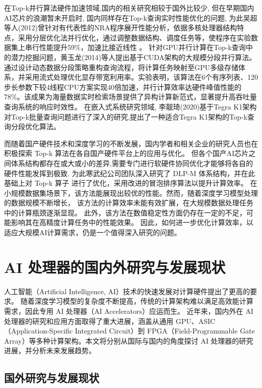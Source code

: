 在Top-k并行算法硬件加速领域,国内的相关研究相较于国外比较少,
但在早期国内AI芯片的浪潮暂未开启时, 国内同样存在Top-k查询实时性能优化的问题,
为此吴超等人(2012)曾针对有代表性的NRA程序展开性能分析，依据多核处理器结构特点，采用分层优化法并行优化，通过调整数据结构、调度任务等，使程序在实验数据集上串行性能提升59\%，加速比接近线性 \cite{XXWX201207019}。 
针对GPU并行计算在Top-k查询中的潜力挖掘问题，黄玉龙(2014)等人提出基于CUDA架构的大规模分段并行算法。通过设计动态数据分段策略重构查询流程，将计算任务映射至GPU多级存储体系，并采用流式处理优化显存带宽利用率。实验表明，该算法在6个有序列表、120步长参数下较4线程CPU方案实现40倍加速，并行计算效率达硬件峰值性能的78\%。该成果为海量数据实时检索场景提供了异构计算新范式，显著提升高吞吐量查询系统的响应时效性。
在嵌入式系统研究领域, 李靓琦(2020)基于Tegra K1架构对Top-k批量查询问题进行了深入的研究,提出了一种适合Tegra K1架构的Top-k查询分段优化算法\cite{DZRU202017051}。

而随着国产硬件技术和深度学习的不断发展，国内学者和相关企业的研究人员也在积极探索 Top-k 算法在各自国产硬件平台上的应用与优化。
但各个国产AI芯片之间体系结构都存在或大或小的差异,需要专门进行软硬件协同优化才能够将各自的硬件性能发挥到极致.
为此寒武纪公司团队深入研究了 DLP-M 体系结构，并在此基础上对 Top-k 算子 进行了优化，采用改进的冒泡排序算法以提升计算效率。
在小规模数据集场景下，该方法能展现出较优的性能。然而，随着深度学习模型处理的数据规模不断增长，
该方法的计算效率未能有效扩展，在大规模数据处理任务中的计算瓶颈逐渐显现。
此外，该方法在数值稳定性方面仍存在一定的不足，可能影响其在高精度计算任务中的性能效果。
因此，如何进一步优化计算效率，以适应大规模AI计算需求，仍是一个值得深入研究的问题。


\section{AI 处理器的国内外研究与发展现状}

人工智能（Artificial Intelligence, AI）技术的快速发展对计算硬件提出了更高的要求。
随着深度学习模型的复杂度不断提高，传统的计算架构难以满足高效能计算需求，因此专用 AI 处理器（AI Accelerators）应运而生。
近年来，国内外在 AI 处理器的研究和应用方面取得了重大进展\cite{yishouyi}，涵盖从通用 GPU、ASIC（Application-Specific Integrated Circuit）到 FPGA（Field-Programmable Gate Array）等多种计算架构。本文将分别从国际与国内的角度探讨 AI 处理器的研究进展，并分析未来发展趋势。

\subsection{国外研究与发展现状}

